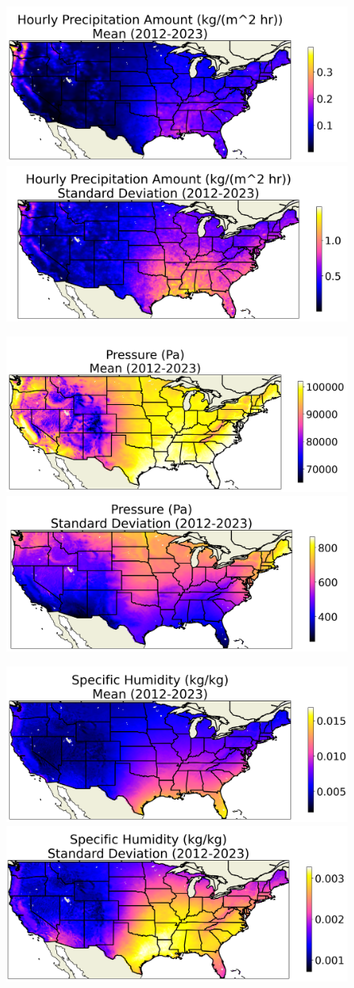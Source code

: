 \begin{figure}[hp!]
    \centering
    \includegraphics[width=.48\linewidth]{figures/thesis-gridstats/gridstat-bulk_apcp_2012-1_2023-12_y000-195_x000-462_mean.png}
    \includegraphics[width=.48\linewidth]{figures/thesis-gridstats/gridstat-bulk_apcp_2012-1_2023-12_y000-195_x000-462_stdev.png}

    \includegraphics[width=.48\linewidth]{figures/thesis-gridstats/gridstat-bulk_pres_2012-1_2023-12_y000-195_x000-462_mean.png}
    \includegraphics[width=.48\linewidth]{figures/thesis-gridstats/gridstat-bulk_pres_2012-1_2023-12_y000-195_x000-462_stdev.png}

    \includegraphics[width=.48\linewidth]{figures/thesis-gridstats/gridstat-bulk_spfh_2012-1_2023-12_y000-195_x000-462_mean.png}
    \includegraphics[width=.48\linewidth]{figures/thesis-gridstats/gridstat-bulk_spfh_2012-1_2023-12_y000-195_x000-462_stdev.png}


\end{figure}
